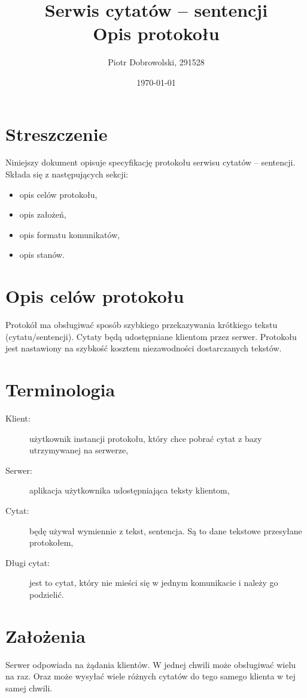 \documentclass{article}
\author{Piotr Dobrowolski, 291528}
\title{Serwis cytatów -- sentencji \\ Opis protokołu}
\date{\today}
\begin{document}
\maketitle
\tableofcontents
\clearpage

\section{Streszczenie}
Niniejszy dokument opisuje specyfikację protokołu serwisu cytatów -- sentencji.
Składa się z następujących sekcji:
\begin{itemize}
\item opis celów protokołu,
\item opis założeń,
\item opis formatu komunikatów,
\item opis stanów.
\end{itemize}


\section{Opis celów protokołu}
Protokół ma obsługiwać sposób szybkiego przekazywania krótkiego tekstu (cytatu/sentencji).
Cytaty będą udostępniane klientom przez serwer.
Protokołu jest nastawiony na szybkość kosztem niezawodności dostarczanych tekstów.


\section{Terminologia}
\begin{description}
\item[Klient: ] użytkownik instancji protokołu, który chce pobrać cytat z bazy utrzymywanej na serwerze,
\item[Serwer: ] aplikacja użytkownika udostępniająca teksty klientom,
\item[Cytat: ] będę używał wymiennie z tekst, sentencja. Są to dane tekstowe przesyłane protokołem,
\item[Długi cytat: ] jest to cytat, który nie mieści się w jednym komunikacie i należy go podzielić.
\end{description}


\section{Założenia}
Serwer odpowiada na żądania klientów. W jednej chwili może obsługiwać wielu na raz.
Oraz może wysyłać wiele różnych cytatów do tego samego klienta w tej samej chwili.
\end{document}
